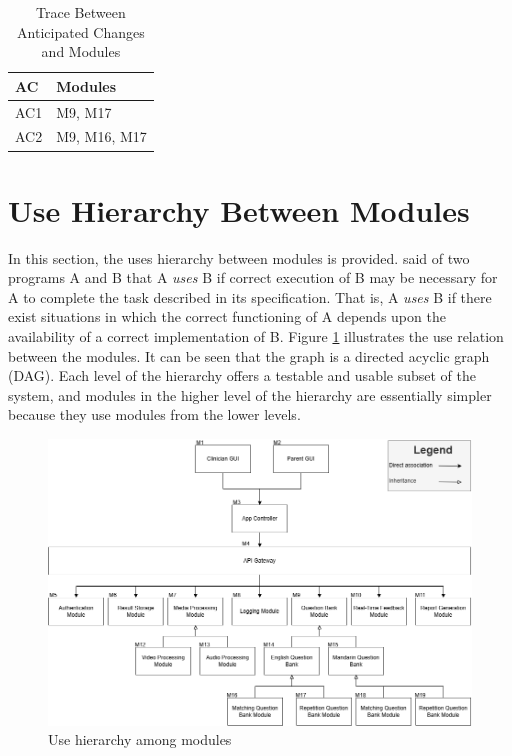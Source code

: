 \documentclass[12pt, titlepage]{article}
\begin{document}
\begin{table}[H]
\centering
\begin{tabular}{p{} p{}}
\toprule
\textbf{AC} & \textbf{Modules}\\
\midrule
AC1 & M9, M17 \\
AC2 & M9, M16, M17 \\
\end{tabular}
\caption{Trace Between Anticipated Changes and Modules}
\label{TblACT}
\end{table}

\newpage

\section{Use Hierarchy Between Modules} \label{SecUse}

In this section, the uses hierarchy between modules is
provided. \citet{Parnas1978} said of two programs A and B that A {\em uses} B if
correct execution of B may be necessary for A to complete the task described in
its specification. That is, A {\em uses} B if there exist situations in which
the correct functioning of A depends upon the availability of a correct
implementation of B.  Figure \ref{FigUH} illustrates the use relation between
the modules. It can be seen that the graph is a directed acyclic graph
(DAG). Each level of the hierarchy offers a testable and usable subset of the
system, and modules in the higher level of the hierarchy are essentially simpler
because they use modules from the lower levels.

\begin{figure}[H]
  \centering
  \includegraphics[scale=0.5]{images/Module Hierachy.drawio.png}
  \caption{Use hierarchy among modules}
  \label{FigUH}
\end{figure}
\end{document}
